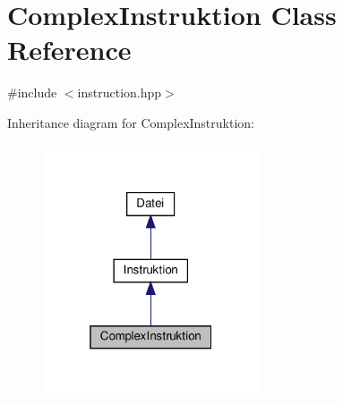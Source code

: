 \hypertarget{class_complex_instruktion}{}\section{Complex\+Instruktion Class Reference}
\label{class_complex_instruktion}


{\ttfamily \#include $<$instruction.\+hpp$>$}



Inheritance diagram for Complex\+Instruktion\+:
\nopagebreak
\begin{figure}[H]
\begin{center}
\leavevmode
\includegraphics[width=181pt]{class_complex_instruktion__inherit__graph}
\end{center}
\end{figure}


